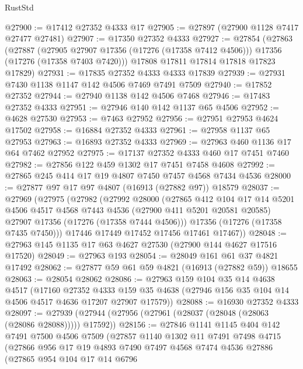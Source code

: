 \begin{lexlean}{RustStd}
\begin{coremodule}
@27900 := @17412 @27352 @4333 @17
@27905 := @27897 (@27900 @1128 @7417 @27477 @27481)
@27907 := @17350 @27352 @4333
@27927 := @27854
    (@27863
      (@27887
        (@27905 @27907 @17356 (@17276 (@17358 @7412 @4506)))
        @17356
        (@17276 (@17358 @7403 @7420)))
      @17808
      @17811
      @17814
      @17818
      @17823
      @17829)
@27931 := @17835 @27352 @4333 @4333 @17839
@27939 := @27931 @7430 @1138 @1147 @142 @4506 @7469 @7491 @7509
@27940 := @17852 @27352
@27944 := @27940 @1138 @142 @4506 @7468
@27946 := @17483 @27352 @4333
@27951 := @27946 @140 @142 @1137 @65 @4506
@27952 := @4628 @27530
@27953 := @7463 @27952
@27956 := @27951 @27953 @4624 @17502
@27958 := @16884 @27352 @4333
@27961 := @27958 @1137 @65 @27953
@27963 := @16893 @27352 @4333
@27969 := @27963 @460 @1136 @17 @64 @7462 @27952
@27975 := @17137 @27352 @4333 @460 @17 @7451 @7460
@27982 := @27856 @122 @459 @1302 @17 @7451 @7458 @4608
@27992 := @27865 @245 @414 @17 @19 @4807 @7450 @7457 @4568 @7434 @4536
@28000 := @27877 @97 @17 @97 @4807 (@16913 (@27882 @97)) @18579
@28037 := @27969
    (@27975
      (@27982
        (@27992
          @28000
          (@27865
            @412
            @104
            @17
            @14
            @5201
            @4506
            @4517
            @4568
            @7443
            @4536
            (@27900 @411 @5201 @20581 @20585)
            @27907
            @17356
            (@17276 (@17358 @7444 @4506)))
          @17356
          (@17276 (@17358 @7435 @7450)))
        @17446
        @17449
        @17452
        @17456
        @17461
        @17467))
@28048 := @27963 @145 @1135 @17 @63 @4627 @27530 (@27900 @144 @4627 @17516 @17520)
@28049 := @27963 @193
@28054 := @28049 @161 @61 @37 @4821 @17492
@28062 := @27877 @59 @61 @59 @4821 (@16913 (@27882 @59)) @18655
@28063 := @28054 @28062
@28086 := @27963
    @159
    @104
    @35
    @14
    @4638
    @4517
    (@17160
      @27352
      @4333
      @159
      @35
      @4638
      (@27946 @156 @35 @104 @14 @4506 @4517 @4636 @17207 @27907 @17579))
@28088 := @16930 @27352 @4333
@28097 := @27939 (@27944 (@27956 (@27961 (@28037 (@28048 (@28063 (@28086 @28088))))) @17592))
@28156 := @27846
    @1141
    @1145
    @404
    @142
    @7491
    @7500
    @4506
    @7509
    (@27857
      @1140
      @1302
      @11
      @7491
      @7498
      @4715
      (@27866
        @956
        @17
        @19
        @4893
        @7490
        @7497
        @4568
        @7474
        @4536
        @27886
        (@27865
          @954
          @104
          @17
          @14
          @6796

\end{coremodule}
\end{lexlean}
